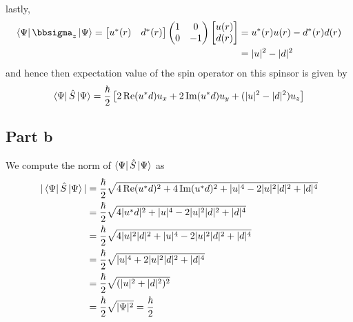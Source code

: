 \documentclass[12pt]{report}
\theoremstyle{custom}
\begin{document}
lastly,
\begin{align*}
  \bra{\Psi} \bbsigma_z \ket{\Psi} = \begin{bmatrix}u^*(r) &  d^*(r)\end{bmatrix}\begin{pmatrix}1 & 0 \\ 0 & -1 \end{pmatrix} \begin{bmatrix} u(r) \\ d(r) \end{bmatrix} &= u^*(r)u(r) - d^*(r)d(r) \\
                                                                     &= |u|^2 - |d|^2
\end{align*}
and hence then expectation value of the spin operator on this spinsor is given by
\begin{equation*}
  \bra{\Psi} \hat{S} \ket{\Psi} = \frac{\hbar}{2} \left[2\operatorname{\text{Re}}(u^*d) u_x + 2\operatorname{\text{Im}}(u^*d)u_y + (|u|^2 - |d|^2)u_z\right]
\end{equation*}

\subsection*{Part b}
We compute the norm of $\bra{\Psi}\hat{S}\ket{\Psi}$ as 
\begin{align*}
  |\bra{\Psi}\hat{S}\ket{\Psi}| &= \frac{\hbar}{2}\sqrt{4\operatorname{\text{Re}}(u^*d)^2 + 4 \operatorname{\text{Im}}(u^*d)^2 + |u|^4 - 2|u|^2|d|^2 + |d|^4} \\
                                &=\frac{\hbar}{2}\sqrt{4|u^*d|^2 + |u|^4 - 2|u|^2|d|^2 + |d|^4} \\
                                &=\frac{\hbar}{2}\sqrt{4|u|^2|d|^2 + |u|^4 - 2|u|^2|d|^2 + |d|^4}  \\
                                &=\frac{\hbar}{2}\sqrt{|u|^4 + 2|u|^2|d|^2 + |d|^4}  \\
                                &=\frac{\hbar}{2}\sqrt{(|u|^2 + |d|^2)^2} \\
                                &= \frac{\hbar}{2} \sqrt{|\Psi|^2} = \frac{\hbar}{2}   
\end{align*}
\end{document}
